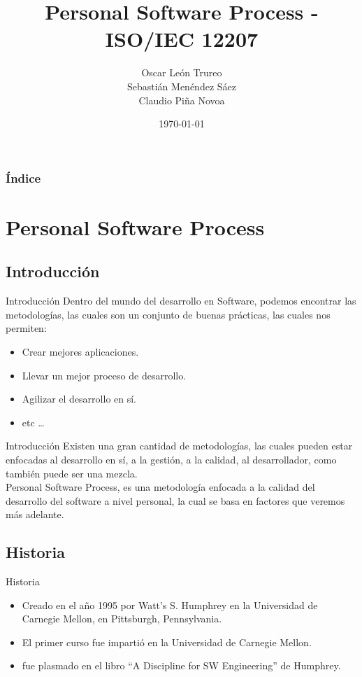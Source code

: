 \documentclass[]{beamer}
\title [Ingeniería en Software]{Personal Software Process - ISO/IEC 12207}
\author[Grupo 1]{Oscar León Trureo\\Sebastián Menéndez Sáez\\Claudio Piña Novoa}
\date{\today}
\institute[]{Universidad Tecnol\'ogica Metropolitana}
\begin{document}
\begin{frame}
	\maketitle
\end{frame}

\begin{frame}
	\frametitle{Índice}
	\tableofcontents[]
\end{frame}

\section{Personal Software Process}
		\subsection{Introducci\'on}
			\begin{frame}{Introducci\'on}
				Dentro del mundo del desarrollo en Software, podemos encontrar las metodolog\'ias, las cuales son un conjunto de buenas pr\'acticas, las cuales nos permiten:\\ \pause
				\begin{itemize}
					\item Crear mejores aplicaciones.\pause
					\item Llevar un mejor proceso de desarrollo.\pause
					\item Agilizar el desarrollo en sí.\pause
					\item etc \ldots
				\end{itemize}				
			\end{frame}
			
			\begin{frame}{Introducci\'on}
				Existen una gran cantidad de metodologías, las cuales pueden estar enfocadas al desarrollo en sí, a la gestión, a la calidad, al desarrollador, como también puede ser una mezcla.\\
				\smallskip
				Personal Software Process, es una metodolog\'ia enfocada a la calidad del desarrollo del software a nivel personal, la cual se basa en factores que veremos más adelante.
			\end{frame}						
			
		\subsection{Historia}
			\begin{frame}{Historia}
				\pause
				\begin{itemize}
					\item Creado en el año 1995 por Watt's S. Humphrey en la Universidad de Carnegie Mellon, en Pittsburgh, Pennsylvania.\\ \pause
					\item El primer curso fue imparti\'o en la Universidad de Carnegie Mellon.\\ \pause
					\item fue plasmado en el libro ``A Discipline for SW Engineering'' de Humphrey.\\
				\end{itemize}
			\end{frame}
		
\end{document}
